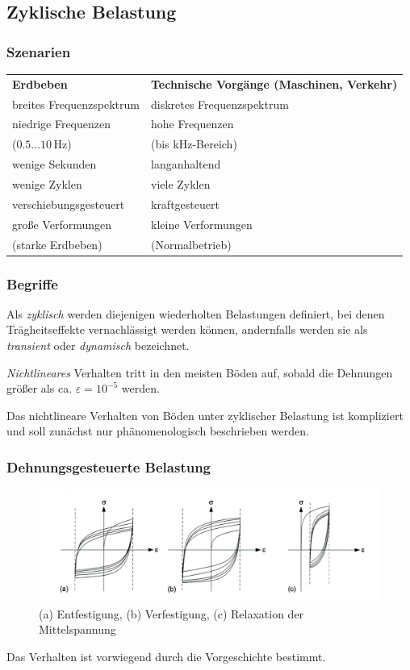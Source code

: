 
\subsection{Zyklische Belastung}

\begin{frame}
\frametitle{Szenarien}

\begin{tabular}{ll} 
\textbf{Erdbeben} & \textbf{Technische Vorgänge (Maschinen, Verkehr)} \\[2mm] 
breites Frequenzspektrum  & diskretes Frequenzspektrum  \\[1mm] 
niedrige Frequenzen& hohe Frequenzen\\
($0.5 \dots 10$\,Hz)  & (bis kHz-Bereich) \\[1mm] 
wenige Sekunden  & langanhaltend \\[1mm] 
wenige Zyklen & viele Zyklen \\[1mm] 
verschiebungsgesteuert & kraftgesteuert \\[1mm] 
große Verformungen& kleine Verformungen\\
(starke Erdbeben) & (Normalbetrieb) 
\end{tabular}

\end{frame}

\begin{frame}
\frametitle{Begriffe}
Als \textsl{zyklisch} werden diejenigen wiederholten Belastungen definiert, 
bei denen Trägheitseffekte vernachlässigt werden können, andernfalls werden sie als
\textsl{transient} oder \textsl{dynamisch} bezeichnet.

\bigskip

\textsl{Nichtlineares} Verhalten tritt in den meisten Böden auf, 
sobald die Dehnungen größer als ca. $\varepsilon=10^{-5}$ werden. 

\bigskip

Das nichtlineare Verhalten von Böden unter zyklischer Belastung ist kompliziert 
und soll zunächst nur phänomenologisch beschrieben werden.
\end{frame}

\begin{frame}
\frametitle{Dehnungsgesteuerte Belastung}
\begin{figure}
\includegraphics[width=\linewidth]{fig_img/bild14abc.jpg}
\caption*{(a) Entfestigung, (b) Verfestigung, (c) Relaxation der Mittelspannung \cite{Vrettos2017}} 
\end{figure}
Das Verhalten ist vorwiegend durch die Vorgeschichte bestimmt.
\end{frame}

